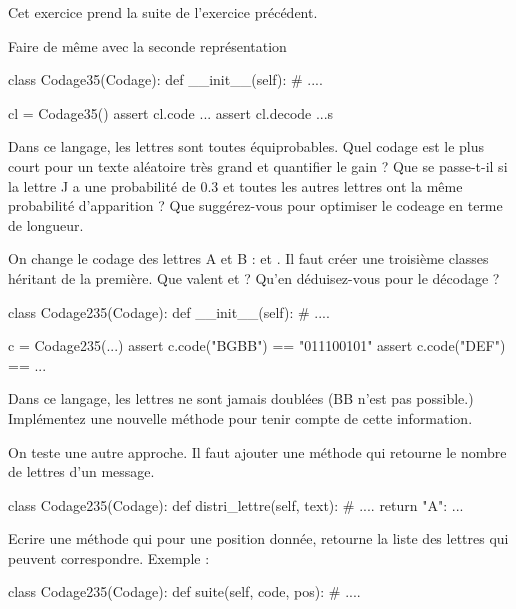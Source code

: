 \newpage

\exosubject{}
\begin{xexercice}\label{td_note_label5_2023}

Cet exercice prend la suite de l'exercice précédent.


\exequest Faire de même avec la seconde représentation

\begin{verbatimx}
class Codage35(Codage):
    def __init__(self):
        # ....

cl = Codage35()
assert cl.code ...
assert cl.decode ...s
\end{verbatimx}

\exequest Dans ce langage, les lettres sont toutes équiprobables.
Quel codage est le plus court pour un texte aléatoire très grand et quantifier le gain ?
Que se passe-t-il si la lettre J a une probabilité de 0.3 et toutes les autres lettres ont la même probabilité
d'apparition ? Que suggérez-vous pour optimiser le codeage en terme de longueur.

\exequest On change le codage des lettres A et B :  et . Il faut créer une troisième classes
héritant de la première. Que valent  et  ?
Qu'en déduisez-vous pour le décodage ?

\begin{verbatimx}
class Codage235(Codage):
    def __init__(self):
        # ....

c = Codage235(...)
assert c.code("BGBB") == "011100101"
assert c.code("DEF") == ...
\end{verbatimx}



\exequest Dans ce langage, les lettres ne sont jamais doublées (BB n'est pas possible.)
Implémentez une nouvelle méthode  pour tenir compte de cette information.

\exequest On teste une autre approche. Il faut ajouter une méthode qui retourne le nombre de lettres
d'un message.

\begin{verbatimx}
class Codage235(Codage):
    def distri_lettre(self, text):
        # ....
        return { "A": ... }
\end{verbatimx}

\exequest Ecrire une méthode qui pour une position donnée,
retourne la liste des lettres qui peuvent correspondre. Exemple :

\begin{verbatimx}
class Codage235(Codage):
    def suite(self, code, pos):
        # ....


\end{verbatimx}
\end{xexercice}
